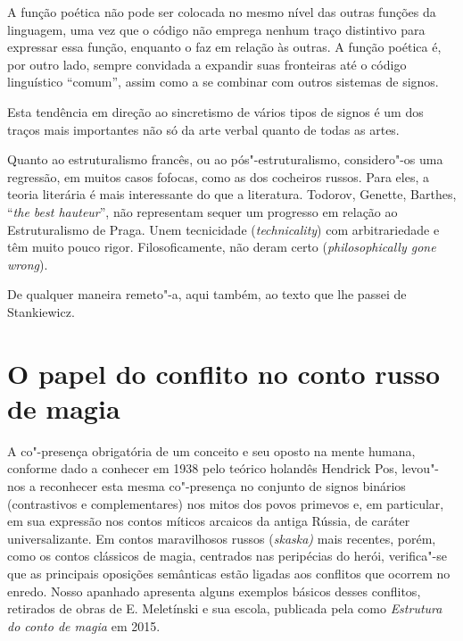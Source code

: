 A função poética não pode ser colocada no mesmo nível das outras funções
da linguagem, uma vez que o código não emprega nenhum traço distintivo
para expressar essa função, enquanto o faz em relação às outras. A
função poética é, por outro lado, sempre convidada a expandir suas
fronteiras até o código linguístico ``comum'', assim como a se combinar
com outros sistemas de signos.

Esta tendência em direção ao sincretismo de vários tipos de signos é um
dos traços mais importantes não só da arte verbal quanto de todas as
artes.

Quanto ao estruturalismo francês, ou ao pós"-estruturalismo, considero"-os
uma regressão, em muitos casos fofocas, como as dos cocheiros russos.
Para eles, a teoria literária é mais interessante do que a literatura.
Todorov, Genette, Barthes, ``\emph{the best hauteur}'', não representam
sequer um progresso em relação ao Estruturalismo de Praga. Unem
tecnicidade (\emph{technicality}) com arbitrariedade e têm muito pouco
rigor. Filosoficamente, não deram certo (\emph{philosophically gone
wrong}).

De qualquer maneira remeto"-a, aqui também, ao texto que lhe passei de
Stankiewicz.

\chapter{O papel do conflito no conto russo de magia}


A co"-presença obrigatória de um conceito e seu oposto na mente humana,
conforme dado a conhecer em 1938 pelo teórico holandês Hendrick Pos,
levou"-nos a reconhecer esta mesma co"-presença no conjunto de signos
binários (contrastivos e complementares) nos mitos dos povos primevos e, em particular, em sua expressão nos contos míticos arcaicos da antiga
Rússia, de caráter universalizante. Em contos maravilhosos russos
(\emph{skaska)} mais recentes, porém, como os contos clássicos de
magia, centrados nas peripécias do herói, verifica"-se que as principais
oposições semânticas estão ligadas aos conflitos que ocorrem no enredo.
Nosso apanhado apresenta alguns exemplos básicos desses conflitos,
retirados de obras de E. Meletínski e sua escola, publicada pela 
como \emph{Estrutura do conto de magia} em 2015.

